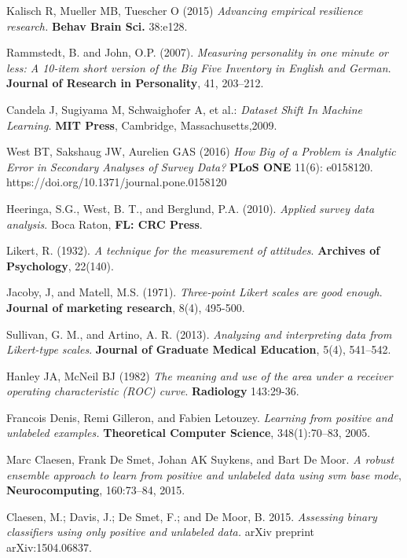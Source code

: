 \begin{thebibliography}{9}

Kalisch R, Mueller MB, Tuescher O (2015) \textit{Advancing empirical resilience research.} \textbf{Behav Brain Sci.} 38:e128.

Rammstedt, B. and John, O.P. (2007). \textit{Measuring personality in one minute or less: A 10-item short version of  the Big Five Inventory in English and German}. \textbf{Journal of Research in Personality}, 41, 203–212. 

Candela J, Sugiyama M, Schwaighofer A, et al.: \textit{Dataset Shift In Machine Learning.} \textbf{MIT Press}, Cambridge, Massachusetts,2009.

West BT, Sakshaug JW, Aurelien GAS (2016) \textit{How Big of a Problem is Analytic Error in Secondary Analyses of Survey Data?} \textbf{PLoS ONE} 11(6): e0158120. https://doi.org/10.1371/journal.pone.0158120

Heeringa, S.G., West, B. T., and Berglund, P.A. (2010). \textit{Applied survey data analysis}. Boca Raton, \textbf{FL: CRC Press}.

Likert, R. (1932). \textit{A technique for the measurement of attitudes}. \textbf{Archives of Psychology}, 22(140).

Jacoby, J, and Matell, M.S. (1971). \textit{Three-point Likert scales are good enough}. \textbf{Journal of marketing research}, 8(4), 495-500.

Sullivan, G. M., and Artino, A. R. (2013). \textit{Analyzing and interpreting data from Likert-type scales}. \textbf{Journal of Graduate Medical Education}, 5(4), 541–542. 

Hanley JA, McNeil BJ (1982) \textit{The meaning and use of the area under a receiver operating characteristic (ROC) curve}. \textbf{Radiology} 143:29-36. 

 Francois Denis, Remi Gilleron, and Fabien Letouzey. \textit{Learning from positive and unlabeled examples.} \textbf{Theoretical Computer Science}, 348(1):70–83, 2005. 

Marc Claesen, Frank De Smet, Johan AK Suykens, and Bart De Moor. \textit{A robust ensemble approach to learn from positive and unlabeled data using svm base mode}, \textbf{Neurocomputing}, 160:73–84, 2015.

Claesen, M.; Davis, J.; De Smet, F.; and De Moor, B. 2015. \textit{Assessing binary classiﬁers using only positive and unlabeled data.} arXiv preprint arXiv:1504.06837.


\end{thebibliography}
